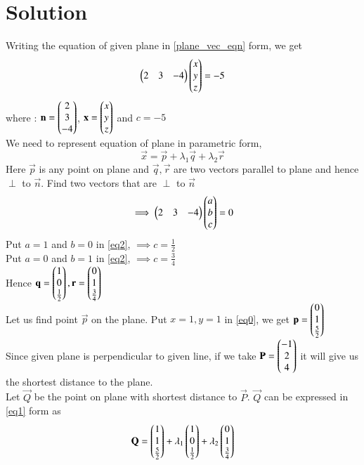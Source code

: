 \documentclass[journal,12pt,twocolumn]{IEEEtran}
\begin{document}
\section{Solution}
Writing the equation of given plane in \eqref{plane_vec_eqn} form, we get
\begin{align}\label{eq0}
	\begin{pmatrix}2 & 3 & -4\end{pmatrix}\begin{pmatrix}x\\y\\z\end{pmatrix} = -5
\end{align}
where :
$\mathbf{n}=\begin{pmatrix}2\\ 3 \\-4\end{pmatrix}$, $\mathbf{x} = \begin{pmatrix}x\\y\\z\end{pmatrix}$  and $c=-5$\\
We need to represent equation of plane in parametric form,
\begin{equation}\label{eq1}
	\vec{x} = \vec{p} + \lambda_1\vec{q} + \lambda_2\vec{r}
\end{equation}
Here $\vec{p}$ is any point on plane and $\vec{q}, \vec{r}$ are two vectors parallel to plane and hence $\perp$ to $\vec{n}$. Find two vectors that are $\perp$ to $\vec{n}$
\begin{align}\label{eq2}
	\implies\begin{pmatrix}2 & 3 & -4\end{pmatrix}\begin{pmatrix}a\\b\\c\end{pmatrix} = 0
\end{align}
Put $a=1$ and $b=0$ in \eqref{eq2}, $\implies c=\frac{1}{2}$\\
Put $a=0$ and $b=1$ in \eqref{eq2}, $\implies c=\frac{3}{4}$\\
Hence $\mathbf{q} = \begin{pmatrix}1\\0\\\frac{1}{2}\end{pmatrix}, \mathbf{r} = \begin{pmatrix}0\\1\\\frac{3}{4}\end{pmatrix}$\\
Let us find point $\vec{p}$ on the plane. Put $x=1,y=1$ in \eqref{eq0}, we get $\mathbf{p} = \begin{pmatrix}0\\1\\\frac{5}{2}\end{pmatrix}$\\
Since given plane is perpendicular to given line, if we take $\mathbf{P} = \begin{pmatrix}-1 \\ 2 \\ 4\end{pmatrix}$ it will give us the shortest distance to the plane. \\
Let $\vec{Q}$ be the point on plane with shortest distance to $\vec{P}$. $\vec{Q}$ can be expressed in \eqref{eq1} form as
\begin{align}\label{eq3}
	\mathbf{Q} = \begin{pmatrix}1\\1\\\frac{5}{2}\end{pmatrix} + \lambda_1\begin{pmatrix}1\\0\\\frac{1}{2}\end{pmatrix} + \lambda_2\begin{pmatrix}0\\1\\\frac{3}{4}\end{pmatrix}
\end{align}
\end{document}
